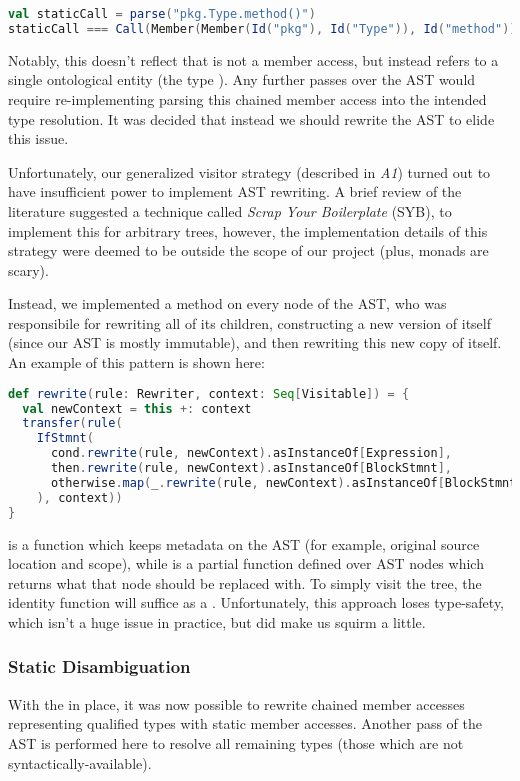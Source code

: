 \documentclass{article}
\begin{document}
\begin{lstlisting}[language=Scala]
val staticCall = parse("pkg.Type.method()")
staticCall === Call(Member(Member(Id("pkg"), Id("Type")), Id("method")))
\end{lstlisting}

Notably, this doesn't reflect that  is not a member access, but instead refers to a single ontological
entity (the type ). Any further passes over the AST would require re-implementing parsing this chained
member access into the intended type resolution. It was decided that instead we should rewrite the AST to elide this
issue.

Unfortunately, our generalized visitor strategy (described in \textit{A1}) turned out to have insufficient power to
implement AST rewriting. A brief review of the literature suggested a technique called \textit{Scrap Your Boilerplate}
(SYB), to implement this for arbitrary trees, however, the implementation details of this strategy were deemed to be
outside the scope of our project (plus, monads are scary).

Instead, we implemented a  method on every node of the AST, who was responsibile for rewriting all of its
children, constructing a new version of itself (since our AST is mostly immutable), and then rewriting this new copy of
itself. An example of this pattern is shown here:

\begin{lstlisting}[language=Scala]
def rewrite(rule: Rewriter, context: Seq[Visitable]) = {
  val newContext = this +: context
  transfer(rule(
    IfStmnt(
      cond.rewrite(rule, newContext).asInstanceOf[Expression],
      then.rewrite(rule, newContext).asInstanceOf[BlockStmnt],
      otherwise.map(_.rewrite(rule, newContext).asInstanceOf[BlockStmnt])
    ), context))
}
\end{lstlisting}

 is a function which keeps metadata on the AST (for example, original source location and scope), while
 is a partial function defined over AST nodes which returns what that node should be replaced with. To simply
visit the tree, the identity function will suffice as a . Unfortunately, this approach loses type-safety,
which isn't a huge issue in practice, but did make us squirm a little.


\subsubsection{Static Disambiguation}
With the  in place, it was now possible to rewrite chained member accesses representing qualified
types with static member accesses. Another pass of the AST is performed here to resolve all remaining types (those which
are not syntactically-available).
\end{document}
